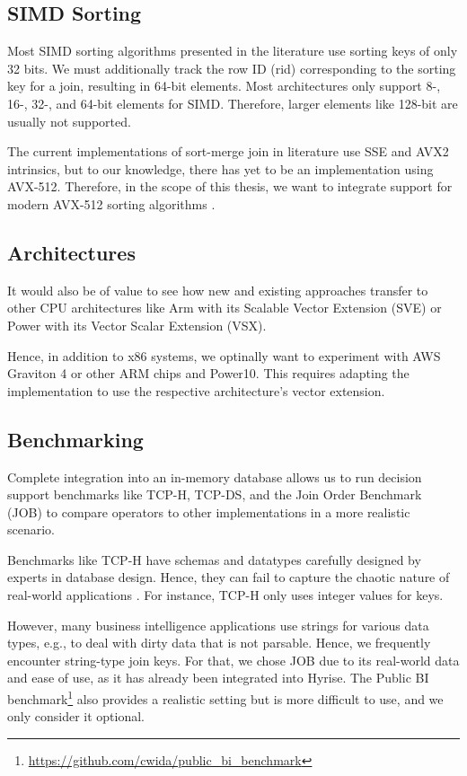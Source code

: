 \subsection{SIMD Sorting}

Most SIMD sorting algorithms presented in the literature use sorting keys of only 32 bits. We must additionally track the row ID
(rid) corresponding to the sorting key for a join, resulting in 64-bit elements. Most architectures
only support 8-, 16-, 32-, and 64-bit elements for SIMD. Therefore, larger elements like 128-bit are
usually not supported.

The current implementations of sort-merge join in literature use SSE and AVX2 intrinsics, but to
our knowledge, there has yet to be an implementation using AVX-512. Therefore, in the scope of
this thesis, we want to integrate support for modern AVX-512 sorting algorithms \cite{Watkins, 8855628}. 

\subsection{Architectures}
It would also be of value to see how new and existing approaches transfer to other CPU
architectures like Arm with its Scalable Vector Extension (SVE) or Power with its Vector Scalar
Extension (VSX).

Hence, in addition to x86 systems, we optinally want to experiment with AWS Graviton 4 or other ARM chips
and Power10. This requires adapting 
the implementation to use the respective architecture's
vector extension.


\subsection{Benchmarking}
Complete integration into an in-memory database allows us to run decision support benchmarks
like TCP-H, TCP-DS, and the Join Order Benchmark (JOB) \cite{DBLP:journals/pvldb/LeisGMBK015} to
compare operators to other implementations in a more realistic scenario.

Benchmarks like TCP-H have schemas and datatypes carefully designed by experts in database design.
Hence, they can fail to capture the chaotic nature of real-world applications \cite{10.1145/3209950.3209952}.
For instance, TCP-H only uses integer values for keys. 

However, many business intelligence applications use strings for various data types, e.g., to deal
with dirty data that is not parsable. Hence, we frequently encounter string-type join keys. For
that, we chose JOB due to its real-world data and ease of use, as it 
has already been integrated into Hyrise. The Public BI benchmark\footnote{\url{https://github.com/cwida/public_bi_benchmark}}
also provides a realistic setting
but is more difficult to use, and we only consider it optional.


